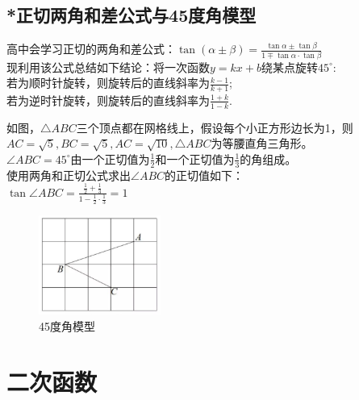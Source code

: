 \documentclass{ecnuthesis}
\begin{document}
\section{*正切两角和差公式与45度角模型}
\begin{knowledge}
    高中会学习正切的两角和差公式：$\tan(\alpha\pm\beta)=\frac{\tan \alpha \pm \tan \beta}{1 \mp \tan \alpha·\tan \beta}$ \\
    现利用该公式总结如下结论：将一次函数$y=kx+b$绕某点旋转$45^\circ$: \\
    若为顺时针旋转，则旋转后的直线斜率为$\frac{k-1}{k+1}$; \\
    若为逆时针旋转，则旋转后的直线斜率为$\frac{1+k}{1-k}$.
\end{knowledge}
\begin{knowledge}
    如图，$\triangle ABC$三个顶点都在网格线上，假设每个小正方形边长为1，则$AC=\sqrt5,BC=\sqrt5,AC=\sqrt{10},\triangle ABC$为等腰直角三角形。\\
    $\angle ABC=45^\circ$由一个正切值为$\frac{1}{2}$和一个正切值为$\frac{1}{3}$的角组成。\\
    使用两角和正切公式求出$\angle ABC$的正切值如下：\\
    $\tan \angle ABC=\frac{\frac{1}{2}+\frac{1}{3}}{1-\frac{1}{2}·\frac{1}{3}}=1$ \\
\end{knowledge}
\begin{figure}[H]
\centering
\includegraphics[width=4cm]{picture/903.png}
\caption{45度角模型}
\end{figure}
\clearpage
\chapter{二次函数}
\end{document}
